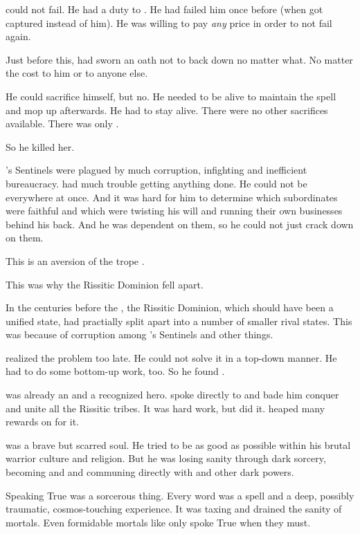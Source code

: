   \Ishnaruchaefir could not fail. 
  He had a duty to \Nexagglachel.
  He had failed him once before (when \Nexagglachel got captured instead of him). 
  He was willing to pay \emph{any} price in order to not fail \Nexagglachel again. 
  
  Just before this, \Ishnaruchaefir had sworn an oath not to back down no matter what. 
  No matter the cost to him or to anyone else. 
  
  He could sacrifice himself, but no. 
  He needed to be alive to maintain the spell and mop up afterwards. 
  He had to stay alive. 
  There were no other sacrifices available. 
  There was only \Rystessakhin. 
  
  So he killed her.


\Secherdamon's Sentinels were plagued by much corruption, infighting and inefficient bureaucracy. 
\Secherdamon had much trouble getting anything done. 
He could not be everywhere at once. 
And it was hard for him to determine which subordinates were faithful and which were twisting his will and running their own businesses behind his back. 
And he was dependent on them, so he could not just crack down on them. 

This is an aversion of the trope .

This was why the Rissitic Dominion fell apart.


In the centuries before the \thirdbanewar, the Rissitic Dominion, which should have been a unified state, had practially split apart into a number of smaller rival states. 
This was because of corruption among \Secherdamon's Sentinels and other things. 

\Secherdamon realized the problem too late. 
He could not solve it in a top-down manner. 
He had to do some bottom-up work, too.
So he found \Narkiza.

\Narkiza was already an \Ashenoch and a recognized hero.
\Secherdamon spoke directly to \Narkiza and bade him conquer and unite all the Rissitic tribes. 
It was hard work, but \Narkiza did it.
\Secherdamon heaped many rewards on \Narkiza for it. 


\Narkiza was a brave but scarred soul.
He tried to be as good as possible within his brutal warrior culture and religion. 
But he was losing sanity through dark sorcery, becoming and \Ashenoch and communing directly with \Nechsain and other dark powers. 


Speaking True \Draconic was a sorcerous thing. 
Every word was a spell and a deep, possibly traumatic, cosmos-touching experience.
It was taxing and drained the sanity of mortals. 
Even formidable mortals like \Criseis only spoke True \Draconic when they must.

